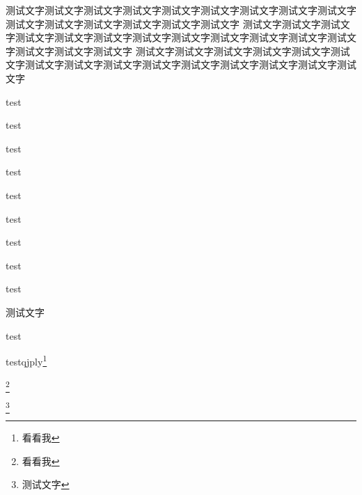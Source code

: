 \begin{multicols}{3}
测试文字测试文字测试文字测试文字测试文字测试文字测试文字测试文字测试文字测试文字测试文字测试文字测试文字测试文字测试文字
测试文字测试文字测试文字测试文字测试文字测试文字测试文字测试文字测试文字测试文字测试文字测试文字测试文字测试文字测试文字
测试文字测试文字测试文字测试文字测试文字测试文字测试文字测试文字测试文字测试文字测试文字测试文字测试文字测试文字测试文字
\end{multicols}




\Listening

\Reading

\Writing

\Speaking


\lipsum[1][1-5]

\begin{UnnumberedItem}[3]

\item test
\item test
\item test
\item test
\item test
\item test
\item test
\item test
\item test
\end{UnnumberedItem}

\begin{NumberedItem}
	\item 测试文字
	\item test
	\item testqjply\footnote{看看我}
\end{NumberedItem}



\begin{Proof}
	\lipsum[1]\footnote{看看我}
	\tcblower
	\lipsum
\end{Proof}

\begin{Block}%
	\lipsum[1]
	\tcblower
	\footnote{测试文字}\lipsum
\end{Block}


\begin{Check}
	\lipsum[1-2]
	\tcbline
	\lipsum[1-2]
\end{Check}

